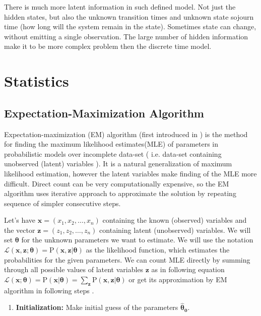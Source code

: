 \documentclass[thesis=M,english]{FITthesis}[2012/10/20]
\newcommand{\matr}[1]{\mathbf{#1}}
\begin{document}
There is much more latent information in such defined model. Not just the hidden states, but also the unknown transition times and unknown state sojourn time (how long will the system remain in the state).
Sometimes state can change, without emitting a single observation. The large number of hidden information make it to be more complex problem then the discrete time model.

\chapter{Statistics}\label{ch:s}


\section{Expectation-Maximization Algorithm}\label{ch:EM}

Expectation-maximization (EM) algorithm (first introduced in \cite{De77}) is the method for finding the maximum likelihood estimates(MLE) of parameters in probabilistic models over incomplete data-set ( i.e. data-set containing unobserved (latent) variables ). It is a natural generalization of maximum likelihood estimation, however the latent variables make finding of the MLE more difficult. Direct count can be very computationally expensive, so the EM algorithm uses iterative approach to approximate the solution by repeating sequence of simpler consecutive steps.

Let's have $\mathbf{x} = (x_{1},x_{2},\dotsc,x_{n})$ containing the known (observed) variables and the vector $\mathbf{z} = (z_{1},z_{2},\dotsc,z_{n})$ containing latent (unobserved) variables. We will set $\boldsymbol{\theta}$ for the unknown parameters we want to estimate. We will use the notation $\mathcal{L}(\mathbf{x},\mathbf{z}; \boldsymbol{\theta}) = \mathrm{P}(\mathbf{x},\mathbf{z} | \boldsymbol{\theta})$ as the likelihood function, which estimates the probabilities for the given parameters. We can count MLE directly by summing through all possible values of latent variables $\matr{z}$ as in following equation $\mathcal{L}(\mathbf{x};\boldsymbol{\theta}) = \mathrm{P}(\mathbf{x} | \boldsymbol{\theta}) = \sum\limits_{\matr{z}} \mathrm{P}(\mathbf{x},\mathbf{z} | \boldsymbol{\theta})$ or get its approximation by EM algorithm in following steps \cite{Li14}.

\begin{enumerate}
\item \textbf{Initialization:} Make initial guess of the parameters $\matr{ \boldsymbol{\hat \theta_{0} }} $.
\end{enumerate} 
\end{document}
